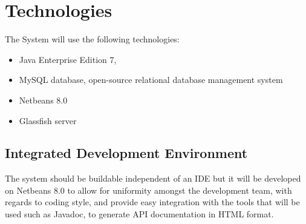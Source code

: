 \documentclass[12pt]{article}
\begin{document}
\section{Technologies}
The System will use the following technologies:
\begin{itemize}
\item Java Enterprise Edition 7, 
\item MySQL database, open-source relational database management system
\item Netbeans 8.0
\item Glassfish server
\end{itemize}

\subsection*{Integrated Development Environment}
The system should be buildable independent of an IDE but it will be developed on Netbeans 8.0 to allow for uniformity amongst the development team, with regards to coding style, and provide easy integration with the tools that will be used such as Javadoc, to generate  API documentation in HTML format.
\end{document}
